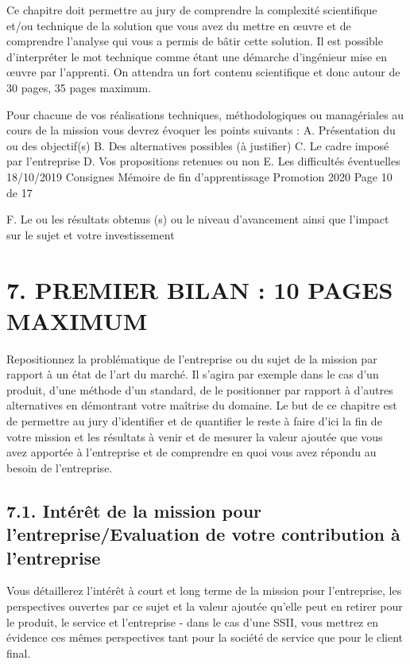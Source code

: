 \documentclass[a4paper, 12pt]{article}
\begin{document}
Ce chapitre doit permettre au jury de comprendre la complexité scientifique et/ou technique de la
solution que vous avez du mettre en œuvre et de comprendre l’analyse qui vous a permis de bâtir cette
solution. Il est possible d’interpréter le mot technique comme étant une démarche d’ingénieur mise
en œuvre par l’apprenti.
On attendra un fort contenu scientifique et donc autour de 30 pages, 35 pages maximum.

Pour chacune de vos réalisations techniques, méthodologiques ou managériales au cours de la mission
vous devrez évoquer les points suivants :
A. Présentation du ou des objectif(s)
B. Des alternatives possibles (à justifier)
C. Le cadre imposé par l’entreprise
D. Vos propositions retenues ou non
E. Les difficultés éventuelles
18/10/2019 Consignes Mémoire de fin d'apprentissage Promotion 2020 Page 10 de 17

F. Le ou les résultats obtenus (s) ou le niveau d’avancement ainsi que l’impact sur le sujet et votre
investissement

\newpage{}
\section{7. PREMIER BILAN : 10 PAGES MAXIMUM}

Repositionnez la problématique de l’entreprise ou du sujet de la mission par rapport à un état de
l’art du marché. Il s’agira par exemple dans le cas d’un produit, d’une méthode d’un standard, de le
positionner par rapport à d’autres alternatives en démontrant votre maîtrise du domaine.
Le but de ce chapitre est de permettre au jury d’identifier et de quantifier le reste à faire d’ici la fin de
votre mission et les résultats à venir et de mesurer la valeur ajoutée que vous avez apportée à
l’entreprise et de comprendre en quoi vous avez répondu au besoin de l’entreprise.

\subsection{7.1. Intérêt de la mission pour l'entreprise/Evaluation de votre contribution à l’entreprise}

Vous détaillerez l’intérêt à court et long terme de la mission pour l’entreprise, les
perspectives ouvertes par ce sujet et la valeur ajoutée qu’elle peut en retirer pour le produit,
le service et l’entreprise - dans le cas d’une SSII, vous mettrez en évidence ces mêmes
perspectives tant pour la société de service que pour le client final.
\end{document}
